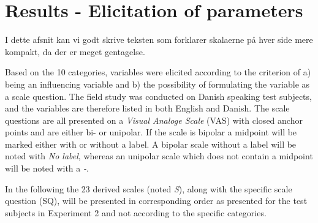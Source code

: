 \section{Results - Elicitation of parameters}
\label{ResultsElicitation}
{\color{red} I dette afsnit kan vi godt skrive teksten som forklarer skalaerne på hver side mere kompakt, da der er meget gentagelse.}

%
%
Based on the 10 categories, variables were elicited according to the criterion of a) being an influencing variable and b) the possibility of formulating the variable as a scale question. The field study was conducted on Danish speaking test subjects, and the variables are therefore listed in both English and Danish. The scale questions are all presented on a \textit{Visual Analoge Scale} (VAS) with closed anchor points and are either bi- or unipolar. If the scale is bipolar a midpoint will be marked either with or without a label. A bipolar scale without a label will be noted with \textit{No label}, whereas an unipolar scale which does not contain a midpoint will be noted with a \textit{-}. 

In the following the 23 derived scales (noted \textit{S}), along with the specific scale question (SQ), will be presented in corresponding order as presented for the test subjects in Experiment 2 and not according to the specific categories.\\ 

